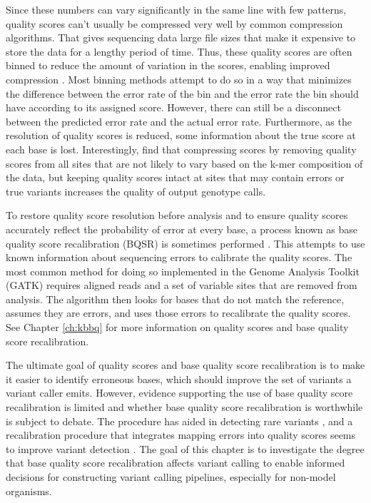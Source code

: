 Since these numbers can vary significantly in the same line with few patterns, quality scores can't usually be compressed very well by common compression algorithms. That gives sequencing data large file sizes that make it expensive to store the data for a lengthy period of time. Thus, these quality scores are often binned to reduce the amount of variation in the scores, enabling improved compression \parencite{shibuya_better_2019, malysa_qvz_2015, yu_quality_2015, noauthor_reducing_2014}. Most binning methods attempt to do so in a way that minimizes the difference between the error rate of the bin and the error rate the bin should have according to its assigned score. However, there can still be a disconnect between the predicted error rate and the actual error rate. Furthermore, as the resolution of quality scores is reduced, some information about the true score at each base is lost. Interestingly, \textcite{yu_quality_2015} find that compressing scores by removing quality scores from all sites that are not likely to vary based on the k-mer composition of the data, but keeping quality scores intact at sites that may contain errors or true variants increases the quality of output genotype calls.

To restore quality score resolution before analysis and to ensure quality scores accurately reflect the probability of error at every base, a process known as base quality score recalibration (BQSR) is sometimes performed \parencite{auwera_fastq_2013, pfeifer_next-generation_2017}. This attempts to use known information about sequencing errors to calibrate the quality scores. The most common method for doing so implemented in the Genome Analysis Toolkit (GATK) requires aligned reads and a set of variable sites that are removed from analysis. The algorithm then looks for bases that do not match the reference, assumes they are errors, and uses those errors to recalibrate the quality scores. See Chapter \ref{ch:kbbq} for more information on quality scores and base quality score recalibration.
	
The ultimate goal of quality scores and base quality score recalibration is to make it easier to identify erroneous bases, which should improve the set of variants a variant caller emits. However, evidence supporting the use of base quality score recalibration is limited and whether base quality score recalibration is worthwhile is subject to debate. The procedure has aided in detecting rare variants \parencite{ni_improvement_2016}, and a recalibration procedure that integrates mapping errors into quality scores seems to improve variant detection \parencite{li_improving_2011}. The goal of this chapter is to investigate the degree that base quality score recalibration affects variant calling to enable informed decisions for constructing variant calling pipelines, especially for non-model organisms.

